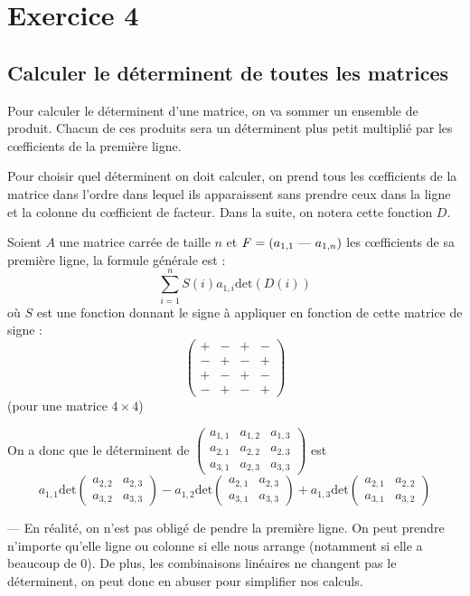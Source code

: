 \documentclass[a4paper, titlepage]{article}
\begin{document}
	\section*{Exercice 4}
	\subsection*{Calculer le déterminent de toutes les matrices}
	Pour calculer le déterminent d'une matrice, on va sommer un ensemble de produit. Chacun de ces produits sera un déterminent plus petit multiplié par les cœfficients de la première ligne.

	Pour choisir quel déterminent on doit calculer, on prend tous les cœfficients de la matrice dans l'ordre dans lequel ils apparaissent sans prendre ceux dans la ligne et la colonne du cœfficient de facteur. Dans la suite, on notera cette fonction $D$.

	Soient $A$ une matrice carrée de taille $n$ et $F=(a_{1,1}~\text{\----}~a_{1,n})$ les cœfficients de sa première ligne, la formule générale est :
	$$ \sum_{i=1}^{n} S(i)a_{1,i}\mathrm{det}(D(i)) $$
	où $S$ est une fonction donnant le signe à appliquer en fonction de cette matrice de signe :
	$$ \begin{pmatrix} +&-&+&-\\-&+&-&+\\+&-&+&-\\-&+&-&+ \end{pmatrix} $$
	(pour une matrice $4\times 4$)

	On a donc que le déterminent de $\begin{pmatrix} a_{1,1}&a_{1,2}&a_{1,3}\\a_{2,1}&a_{2,2}&a_{2,3}\\a_{3,1}&a_{2,3}&a_{3,3} \end{pmatrix} $ est $$ a_{1,1}\mathrm{det}\begin{pmatrix} a_{2,2}&a_{2,3}\\a_{3,2}&a_{3,3} \end{pmatrix} - a_{1,2}\mathrm{det}\begin{pmatrix} a_{2,1}&a_{2,3}\\a_{3,1}&a_{3,3} \end{pmatrix} + a_{1,3}\mathrm{det}\begin{pmatrix} a_{2,1}&a_{2,2}\\a_{3,1}&a_{3,2} \end{pmatrix}  $$

	 \---- En réalité, on n'est pas obligé de pendre la première ligne. On peut prendre n'importe qu'elle ligne ou colonne si elle nous arrange (notamment si elle a beaucoup de 0). De plus, les combinaisons linéaires ne changent pas le déterminent, on peut donc en abuser pour simplifier nos calculs.
\end{document}
